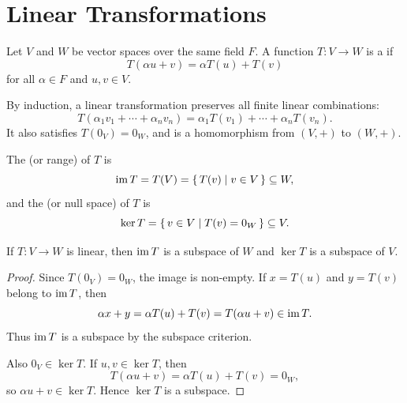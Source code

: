 

\section{Linear Transformations}\label{sec:LinearTransformations}

\begin{Definition}
Let $V$ and $W$ be vector spaces over the same field $F$. A function $T\colon V\to W$ is a  if
\begin{equation*}
T(\alpha u+v)=\alpha T(u)+T(v)
\end{equation*}
for all $\alpha\in F$ and $u,v\in V$.
\end{Definition}

By induction, a linear transformation preserves all finite linear combinations:
\begin{equation*}
T(\alpha_1v_1+\cdots+\alpha_nv_n)
=\alpha_1T(v_1)+\cdots+\alpha_nT(v_n).
\end{equation*}
It also satisfies $T(0_V)=0_W$, and is a homomorphism from $(V,+)$ to $(W,+)$.

The  (or range) of $T$ is
\begin{equation*}
\operatorname{im} T=T(V)=\qty{\, T(v) \mid v\in V \,}\subseteq W,
\end{equation*}
and the  (or null space) of $T$ is
\begin{equation*}
\ker T=\qty{\, v\in V \mid T(v)=0_W \,}\subseteq V.
\end{equation*}

\begin{Theorem}\label{thm:ImageKernel}
If $T\colon V\to W$ is linear, then $\operatorname{im} T$ is a subspace of $W$ and $\ker T$ is a subspace of $V$.
\end{Theorem}
\begin{proof}
Since $T(0_V)=0_W$, the image is non-empty. If $x=T(u)$ and $y=T(v)$ belong to $\operatorname{im} T$, then
\begin{equation*}
\alpha x+y=\alpha T(u)+T(v)=T(\alpha u+v)\in\operatorname{im} T.
\end{equation*}
Thus $\operatorname{im} T$ is a subspace by the subspace criterion.

Also $0_V\in\ker T$. If $u,v\in\ker T$, then
\begin{equation*}
T(\alpha u+v)=\alpha T(u)+T(v)=0_W,
\end{equation*}
so $\alpha u+v\in\ker T$. Hence $\ker T$ is a subspace.
\end{proof}

